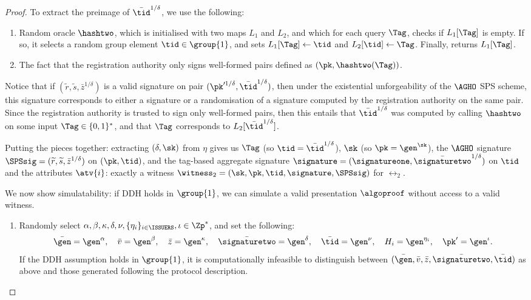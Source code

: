 \begin{proof}
  To extract the preimage of $\bar{\tid}^{1/\delta}$, we use the following:

  \begin{enumerate}

    \item Random oracle $\hashtwo$, which is initialised with two maps $L_1$ and
$L_2$, and which for each query $\Tag$, checks if $L_1[\Tag]$ is empty. If so,
it  selects a random group element $\tid \in \group{1}$, and sets $L_1[\Tag]
\leftarrow \tid$ and $L_2[\tid] \leftarrow \Tag$.  Finally, returns $L_1[\Tag]$.

    \item The fact that the registration authority only signs well-formed pairs
defined as $(\pk, \hashtwo(\Tag))$.

  \end{enumerate}

  Notice that if $(\widetilde{r}, \widetilde{s}, \bar{z}^{1/\delta})$ is a valid
signature on pair $(\pk'^{1/\delta}, \bar{\tid}^{1/\delta})$, then under the
existential unforgeability of the $\AGHO$ SPS scheme, this signature
corresponds to either a signature or a randomisation of a signature computed by
the registration authority on the same pair.  Since the registration authority
is trusted to sign only well-formed pairs, then this entails that
$\bar{\tid}^{1/\delta}$ was computed by calling $\hashtwo$ on some input $\Tag
\in \{0,1\}^*$, and that $\Tag$ corresponds to $L_2[\bar{\tid}^{1/\delta}]$.

  Putting the pieces together: extracting $(\delta, \sk)$ from $\eta$ gives us
$\Tag$ (so $\tid = \bar{\tid}^{1/\delta}$), $\sk$ (so $\pk = \gen^\sk$), the
  $\AGHO$ signature $\SPSsig = (\widetilde{r}, \widetilde{s}, \bar{z}^{1/\delta})$ on
$(\pk, \tid)$, and the tag-based aggregate signature $\signature =
(\signatureone, \bar{\signaturetwo}^{1/\delta})$ on $\tid$ and the attributes
$\atv{i}$: exactly a witness $\witness_2 = (\sk, \pk, \tid, \signature,
\SPSsig)$ for $\rel_2$.

  We now show simulatability: if DDH holds in $\group{1}$, we
can simulate a valid presentation $\algoproof$ without access to a valid
witness.

  \begin{enumerate}

    \item Randomly select $\alpha, \beta, \kappa, \delta, \nu, \{\eta_i\}_{i\in
\ISSUERS},  \iota \in \Zp^*$, and set the following:
%
      \begin{equation*}
%
	\bar{\gen} = \gen^\alpha, \quad \bar{v} = \gen^\beta, \quad \bar{z} =
\gen^\kappa, \quad \bar{\signaturetwo} = \gen^\delta, \quad \bar{\tid} =
\gen^\nu, \quad H_i = \gen^{\eta_i}, \quad \pk' = \gen^\iota.
%
      \end{equation*}
%
      If the DDH assumption holds in $\group{1}$, it is computationally
infeasible to distinguish between $(\bar{\gen}, \bar{v}, \bar{z},
\bar{\signaturetwo}, \bar{\tid})$ as above and those generated following the
protocol description.


\end{enumerate}
\end{proof}
